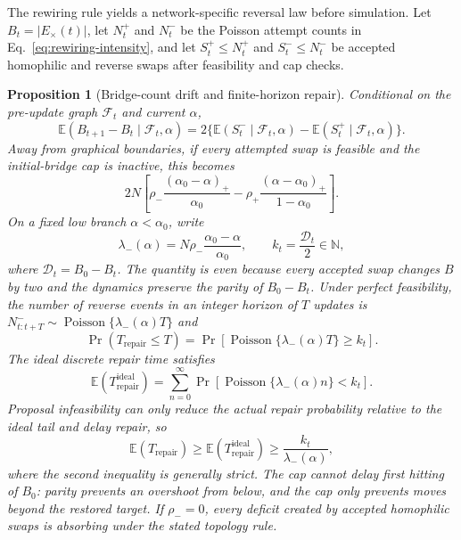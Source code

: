 \documentclass[10pt,a4paper]{article}
\newcommand{\E}{\mathbb{E}}
\newtheorem{proposition}{Proposition}
\begin{document}
The rewiring rule yields a network-specific reversal law before simulation. Let $B_t=|E_\times(t)|$, let $N_t^+$ and $N_t^-$ be the Poisson attempt counts in Eq.~\eqref{eq:rewiring-intensity}, and let $S_t^+\leq N_t^+$ and $S_t^-\leq N_t^-$ be accepted homophilic and reverse swaps after feasibility and cap checks.
\begin{proposition}[Bridge-count drift and finite-horizon repair]
\label{prop:bridge-drift}
Conditional on the pre-update graph $\mathcal F_t$ and current $\alpha$,
\begin{equation}
\E(B_{t+1}-B_t\mid\mathcal F_t,\alpha)
=2\{\E(S_t^-\mid\mathcal F_t,\alpha)-\E(S_t^+\mid\mathcal F_t,\alpha)\}.
\label{eq:bridge-drift}
\end{equation}
Away from graphical boundaries, if every attempted swap is feasible and the initial-bridge cap is inactive, this becomes
\begin{equation}
2N\left[\rho_-\frac{(\alpha_0-\alpha)_+}{\alpha_0}
-\rho_+\frac{(\alpha-\alpha_0)_+}{1-\alpha_0}\right].
\label{eq:interior-bridge-drift}
\end{equation}
On a fixed low branch $\alpha<\alpha_0$, write
\begin{equation}
\lambda_-(\alpha)=N\rho_-\frac{\alpha_0-\alpha}{\alpha_0},
\qquad k_t=\frac{\mathcal D_t}{2}\in\mathbb N,
\end{equation}
where $\mathcal D_t=B_0-B_t$. The quantity is even because every accepted swap changes $B$ by two and the dynamics preserve the parity of $B_0-B_t$. Under perfect feasibility, the number of reverse events in an integer horizon of $T$ updates is $N^-_{t:t+T}\sim\operatorname{Poisson}\{\lambda_-(\alpha)T\}$ and
\begin{equation}
\Pr(T_{\mathrm{repair}}\leq T)
=\Pr[\operatorname{Poisson}\{\lambda_-(\alpha)T\}\geq k_t].
\label{eq:reverse-budget}
\end{equation}
The ideal discrete repair time satisfies
\begin{equation}
\E(T_{\mathrm{repair}}^{\mathrm{ideal}})
=\sum_{n=0}^{\infty}
\Pr[\operatorname{Poisson}\{\lambda_-(\alpha)n\}<k_t].
\label{eq:ideal-mean-repair-time}
\end{equation}
Proposal infeasibility can only reduce the actual repair probability relative to the ideal tail and delay repair, so
\begin{equation}
\E(T_{\mathrm{repair}})
\geq \E(T_{\mathrm{repair}}^{\mathrm{ideal}})
\geq \frac{k_t}{\lambda_-(\alpha)},
\label{eq:mean-repair-time}
\end{equation}
where the second inequality is generally strict. The cap cannot delay first hitting of $B_0$: parity prevents an overshoot from below, and the cap only prevents moves beyond the restored target. If $\rho_-=0$, every deficit created by accepted homophilic swaps is absorbing under the stated topology rule.
\end{proposition}
\end{document}
